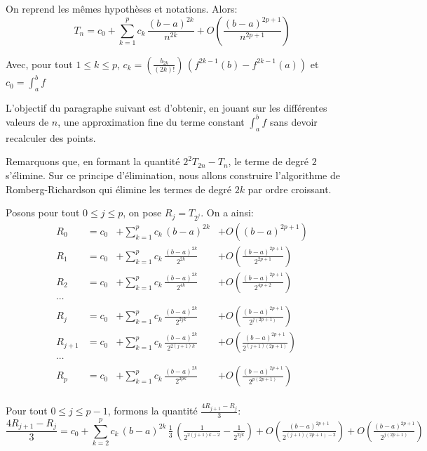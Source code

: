 \begin{prop}
On reprend les mêmes hypothèses et notations. Alors:
\[
T_n = c_0 + \displaystyle{\sum_{k=1}^p} c_k \, \frac{(b-a)^{2k}}{n^{2k}} + O\left ( \frac{(b-a)^{2p+1}}{n^{2p+1}} \right )
\]

Avec, pour tout $1 \leq k \leq p$, $c_k = \left (\tfrac{b_{2k}}{(2k)!}\right ) \, \left ( f^{2k-1}(b) - f^{2k-1}(a) \right )$ et $c_0 = \displaystyle{\int_a^b} f$
\end{prop}

L'objectif du paragraphe suivant est d'obtenir, en jouant sur les différentes valeurs de $n$, une approximation fine du terme constant $\displaystyle{\int_a^b} f$ sans devoir recalculer des points.

\medskip
Remarquons que, en formant la quantité $2^2T_{2n} - T_n$, le terme de degré $2$ s'élimine. Sur ce principe d'élimination, nous allons construire l'algorithme de Romberg-Richardson qui élimine les termes de degré $2k$ par ordre croissant.

\medskip
Posons pour tout $0 \leq j \leq p$, on pose $R_j = T_{2^j}$. On a ainsi:
\[
\begin{array}{llll}
R_0 & = c_0 & +\displaystyle{\sum_{k=1}^p} c_k \, (b-a)^{2k} & + O\left ((b-a)^{2p+1}\right ) \\
R_1 & = c_0 & +\displaystyle{\sum_{k=1}^p} c_k \, \tfrac{(b-a)^{2k}}{2^{2k}} & + O\left (\tfrac{(b-a)^{2p+1}}{2^{2p+1}}\right ) \\
R_2 & = c_0 & +\displaystyle{\sum_{k=1}^p} c_k \, \tfrac{(b-a)^{2k}}{2^{4k}} & + O\left (\tfrac{(b-a)^{2p+1}}{2^{4p+2}}\right ) \\
\cdots \\
R_j & = c_0 & +\displaystyle{\sum_{k=1}^p} c_k \, \tfrac{(b-a)^{2k}}{2^{2jk}} & + O\left (\tfrac{(b-a)^{2p+1}}{2^{j(2p+1)}}\right ) \\
R_{j+1} & = c_0 & +\displaystyle{\sum_{k=1}^p} c_k \, \tfrac{(b-a)^{2k}}{2^{2(j+1)k}} & + O\left (\tfrac{(b-a)^{2p+1}}{2^{(j+1)(2p+1)}}\right ) \\
\cdots \\
R_{p} & = c_0 & +\displaystyle{\sum_{k=1}^p} c_k \, \tfrac{(b-a)^{2k}}{2^{2pk}} & + O\left (\tfrac{(b-a)^{2p+1}}{2^{p(2p+1)}}\right ) \\
\end{array}
\]

Pour tout $0 \leq j \leq p-1$, formons la quantité $\frac{4R_{j+1} - R_j}{3}$:
\[
\frac{4R_{j+1} - R_j}{3} = c_0 + \displaystyle{\sum_{k=2}^p} c_k \, (b-a)^{2k} \, \tfrac{1}{3} \, \left ( \tfrac{1}{2^{2(j+1)k-2}}-\tfrac{1}{2^{2jk}}\right ) + O\left (\tfrac{(b-a)^{2p+1}}{2^{(j+1)(2p+1)-2}}\right ) + O\left (\tfrac{(b-a)^{2p+1}}{2^{j(2p+1)}} \right )
\]

